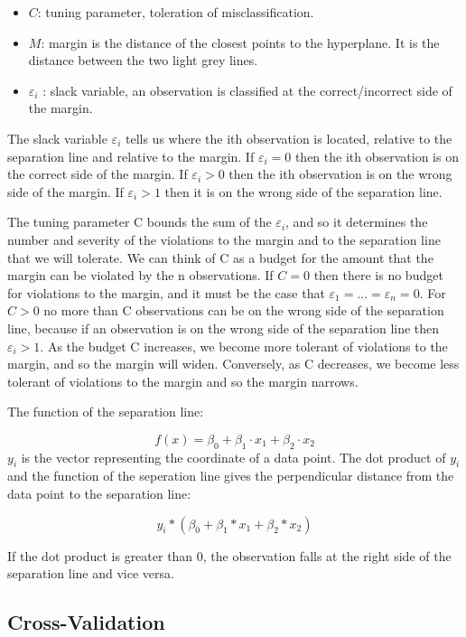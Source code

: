 \documentclass[10pt,letterpaper]{article}
\providecommand{\tightlist}{%
  \setlength{\itemsep}{0pt}\setlength{\parskip}{0pt}}
\begin{document}
\begin{itemize}
\tightlist
\item
  \(C\): tuning parameter, toleration of misclassification.
\item
  \(M\): margin is the distance of the closest points to the hyperplane.
  It is the distance between the two light grey lines.
\item
  \(\varepsilon_i\) : slack variable, an observation is classified at
  the correct/incorrect side of the margin.
\end{itemize}

The slack variable \(\varepsilon_i\) tells us where the ith observation
is located, relative to the separation line and relative to the margin.
If \(\varepsilon_i = 0\) then the ith observation is on the correct side
of the margin. If \(\varepsilon_i > 0\) then the ith observation is on
the wrong side of the margin. If \(\varepsilon_i > 1\) then it is on the
wrong side of the separation line.

The tuning parameter C bounds the sum of the \(\varepsilon_i\), and so
it determines the number and severity of the violations to the margin
and to the separation line that we will tolerate. We can think of C as a
budget for the amount that the margin can be violated by the n
observations. If \(C = 0\) then there is no budget for violations to the
margin, and it must be the case that
\(\varepsilon_1 = . . . = \varepsilon_n = 0\). For \(C > 0\) no more
than C observations can be on the wrong side of the separation line,
because if an observation is on the wrong side of the separation line
then \(\varepsilon_i > 1\). As the budget C increases, we become more
tolerant of violations to the margin, and so the margin will widen.
Conversely, as C decreases, we become less tolerant of violations to the
margin and so the margin narrows.

The function of the separation line:

\[f(x) = \beta_0 + \beta_1 \cdot x_1 + \beta_2 \cdot x_2 \] \(y_i\) is
the vector representing the coordinate of a data point. The dot product
of \(y_i\) and the function of the seperation line gives the
perpendicular distance from the data point to the separation line:

\[y_i * ( \beta_0 + \beta_1 * x_1 + \beta_2 * x_2 )\]

If the dot product is greater than 0, the observation falls at the right
side of the separation line and vice versa.

\subsection{Cross-Validation}\label{cross-validation}
\end{document}
